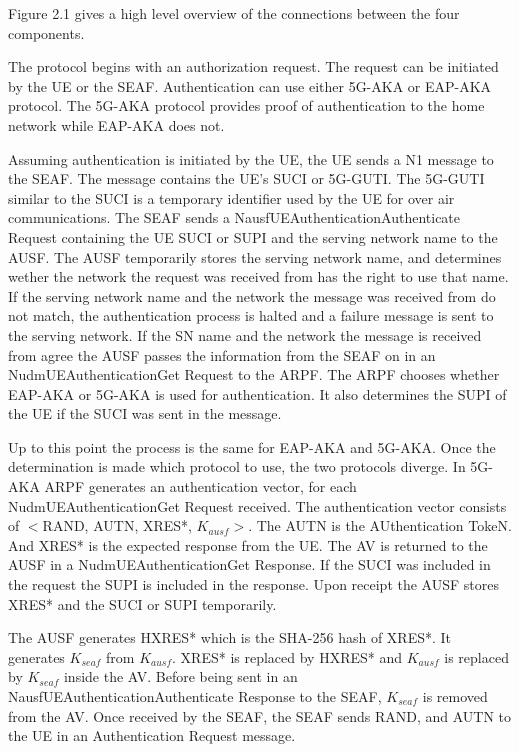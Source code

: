 \documentclass[10pt, pdftex]{article}
\begin{document}
Figure 2.1 gives a high level overview of the connections between the four components.
\newline

The protocol begins with an authorization request.  The request can be initiated by the UE or the SEAF.  Authentication can use either 5G-AKA or EAP-AKA protocol.  The 5G-AKA protocol provides proof of authentication to the home network while EAP-AKA does not.  

Assuming authentication is initiated by the UE, the UE sends a N1 message to the SEAF.  The message contains the UE's SUCI or 5G-GUTI.  The 5G-GUTI similar to the SUCI is a temporary identifier used by the UE for over air communications.  The SEAF sends a Nausf\textunderscore UEAuthentication\textunderscore Authenticate Request containing the UE SUCI or SUPI and the serving network name to the AUSF.  The AUSF temporarily stores the serving network name, and determines wether the network the request was received from has the right to use that name.  If the serving network name and the network the message was received from do not match, the authentication process is halted and a failure message is sent to the serving network.  If the SN name and the network the message is received from agree the AUSF passes the information from the SEAF on in an Nudm\textunderscore UEAuthentication\textunderscore Get Request to the ARPF.  The ARPF chooses whether EAP-AKA or 5G-AKA is used for authentication.  It also determines the SUPI of the UE if the SUCI was sent in the message.  

Up to this point the process is the same for EAP-AKA and 5G-AKA.  Once the determination is made which protocol to use, the two protocols diverge.  In 5G-AKA ARPF generates an authentication vector, for each Nudm\textunderscore UEAuthentication\textunderscore Get Request received.  The authentication vector consists of $<$RAND, AUTN, XRES*, $K_{ausf}$$>$.  The AUTN is the AUthentication TokeN.  And XRES* is the expected response from the UE.  The AV is returned to the AUSF in a Nudm\textunderscore UEAuthentication\textunderscore Get Response.  If the SUCI was included in the request the SUPI is included in the response.  Upon receipt the AUSF stores XRES* and the SUCI or SUPI temporarily.  

The AUSF generates HXRES* which is the SHA-256 hash of XRES*.  It generates $K_{seaf}$ from $K_{ausf}$.  XRES* is replaced by HXRES* and $K_{ausf}$ is replaced by $K_{seaf}$ inside the AV.  Before being sent in an Nausf\textunderscore UEAuthentication\textunderscore Authenticate Response to the SEAF, $K_{seaf}$ is removed from the AV.  Once received by the SEAF, the SEAF sends RAND, and AUTN to the UE in an Authentication Request message.  
\end{document}
